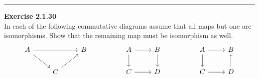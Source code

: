 \documentclass[a4paper, 12pt]{article}
\newenvironment{problem}[2][Exercise]
    { \begin{mdframed}[backgroundcolor=gray!20] \textbf{#1 #2} \\}
    {  \end{mdframed}}
\begin{document}
\noindent\rule{7in}{2.8pt}
\begin{problem}{2.1.30}
In each of the following commutative diagrams assume that all maps but one are isomorphisms. Show that the remaining map must be isomorphism as well. 
\[\begin{tikzcd}
	A && B && A & B && A & B \\
	& C &&& C & D && C & D
	\arrow[from=1-1, to=1-3]
	\arrow[from=1-1, to=2-2]
	\arrow[from=1-5, to=1-6]
	\arrow[from=1-5, to=2-5]
	\arrow[from=1-6, to=2-6]
	\arrow[from=1-8, to=1-9]
	\arrow[from=1-8, to=2-8]
	\arrow[from=2-2, to=1-3]
	\arrow[from=2-5, to=2-6]
	\arrow[from=2-8, to=2-9]
	\arrow[from=2-9, to=1-9]
\end{tikzcd}\]
\end{problem}
\end{document}
